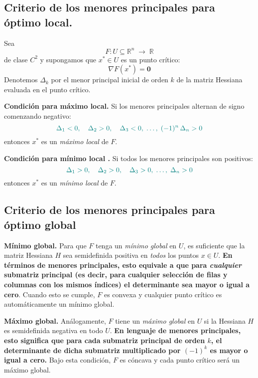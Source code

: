 \documentclass{article}
\begin{document}
\subsection*{Criterio de los menores principales para óptimo local.}

Sea 
\[
F\colon U\subseteq\mathbb{R}^n\;\longrightarrow\;\mathbb{R}
\]
de clase \(C^2\) y supongamos que \(x^*\in U\) es un punto crítico:
\[
\nabla F(x^*) = \mathbf{0}
\]
Denotemos $\Delta_k$ por el menor principal inicial de orden \(k\) de la matriz Hessiana evaluada en el punto crítico.

\medskip

\noindent\textbf{Condición para máximo local.}  
Si los menores principales alternan de signo comenzando negativo:
\[\color{teal}
\Delta_1 < 0,\quad \Delta_2 > 0,\quad \Delta_3 < 0,\;\dots,\;(-1)^n\,\Delta_n > 0
\]
entonces \(x^*\) es un \emph{máximo local } de \(F\).

\medskip

\noindent\textbf{Condición para mínimo local .}  
Si todos los menores principales son positivos:
\[\color{teal}
\Delta_1 > 0,\quad \Delta_2 > 0,\quad \Delta_3 > 0,\;\dots,\;\Delta_n > 0
\]
entonces \(x^*\) es un \emph{mínimo local } de \(F\).



\subsection*{Criterio de los menores principales para óptimo global}


\noindent\textbf{Mínimo global.}  
Para que \(F\) tenga un \emph{mínimo global} en \(U\), es suficiente que la matriz Hessiana \(H\) sea semidefinida positiva en \emph{todos} los puntos \(x\in U\). \textbf{\color{teal}En términos de menores principales, esto equivale a que para \emph{cualquier} submatriz principal (es decir, para cualquier selección de filas y columnas con los mismos índices) el determinante sea mayor o igual a cero}. Cuando esto se cumple, \(F\) es convexa y cualquier punto crítico es automáticamente un mínimo global.

\medskip

\noindent\textbf{Máximo global.}  
Análogamente, \(F\) tiene un \emph{máximo global} en \(U\) si la Hessiana \(H\) es semidefinida negativa en todo \(U\). \textbf{\color{teal}En lenguaje de menores principales, esto significa que para cada submatriz principal de orden \(k\), el determinante de dicha submatriz multiplicado por \((-1)^k\) es mayor o igual a cero.} Bajo esta condición, \(F\) es cóncava y cada punto crítico será un máximo global.
\end{document}
